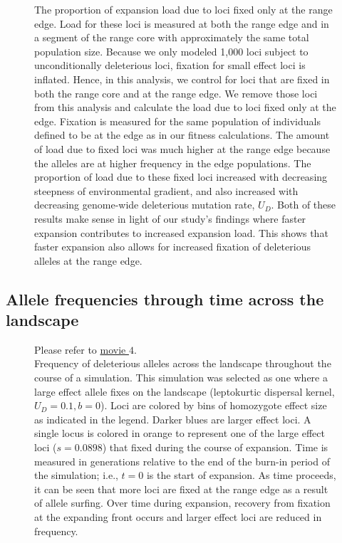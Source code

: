 \begin{figure}[h!]
\centering
{}
\caption[ ~ - Load due to loci fixed at the range edge.]{The proportion of expansion load due to loci fixed only at the range edge. Load for these loci is measured at both the range edge and in a segment of the range core with approximately the same total population size. Because we only modeled 1,000 loci subject to unconditionally deleterious loci, fixation for small effect loci is inflated. Hence, in this analysis, we control for loci that are fixed in both the range core and at the range edge. We remove those loci from this analysis and calculate the load due to loci fixed only at the edge. Fixation is measured for the same population of individuals defined to be at the edge as in our fitness calculations. The amount of load due to fixed loci was much higher at the range edge because the alleles are at higher frequency in the edge populations. The proportion of load due to these fixed loci increased with decreasing steepness of environmental gradient, and also increased with decreasing genome-wide deleterious mutation rate, $U_D$. Both of these results make sense in light of our study's findings where faster expansion contributes to increased expansion load. This shows that faster expansion also allows for increased fixation of deleterious alleles at the range edge.}
\label{fig:fixedload}
\end{figure}


\newpage{}


\subsection*{Allele frequencies through time across the landscape}

\begin{figure}[h!]
\caption[ ~ - Frequency of deleterious alleles across the landscape throughout the course of a simulation.]{Please refer to \href{http://www.zoology.ubc.ca/~kgilbert/AlleleFrequencies.mp4}{movie $4$}. \\ Frequency of deleterious alleles across the landscape throughout the course of a simulation. This simulation was selected as one where a large effect allele fixes on the landscape (leptokurtic dispersal kernel, $U_D = 0.1, b = 0$). Loci are colored by bins of homozygote effect size as indicated in the legend. Darker blues are larger effect loci. A single locus is colored in orange to represent one of the large effect loci ($s = 0.0898$) that fixed during the course of expansion. Time is measured in generations relative to the end of the burn-in period of the simulation; i.e., $t = 0$ is the start of expansion. As time proceeds, it can be seen that more loci are fixed at the range edge as a result of allele surfing. Over time during expansion, recovery from fixation at the expanding front occurs and larger effect loci are reduced in frequency.}
\label{fig:allfreqmov}
\end{figure}
